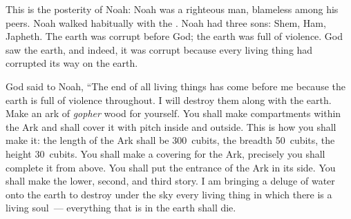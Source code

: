 \begin{inparaenum}
   This is the posterity of Noah: Noah was a righteous man, blameless among his peers. Noah walked habitually with the \lord.%
   Noah had three sons: Shem, Ham, Japheth.%
   The earth was corrupt before God; the earth was full of violence.%
   God saw the earth, and indeed, it was corrupt because every living thing had corrupted its way on the earth.%
  
   God said to Noah, ``The end of all living things has come before me because the earth is full of violence throughout. I will destroy them along with the earth.%
   Make an ark of \textit{gopher} wood for yourself. You shall make compartments within the Ark and shall cover it with pitch inside and outside.%
   This is how you shall make it: the length of the Ark shall be 300~cubits, the breadth 50~cubits, the height 30~cubits.%
   You shall make a covering for the Ark, precisely you shall complete it from above. You shall put the entrance of the Ark in its side. You shall make the lower, second, and third story.\understood%
   I am bringing a deluge of water onto the earth to destroy under the sky every living thing in which there is a living soul~--- everything that is in the earth shall die.%

\end{inparaenum}
